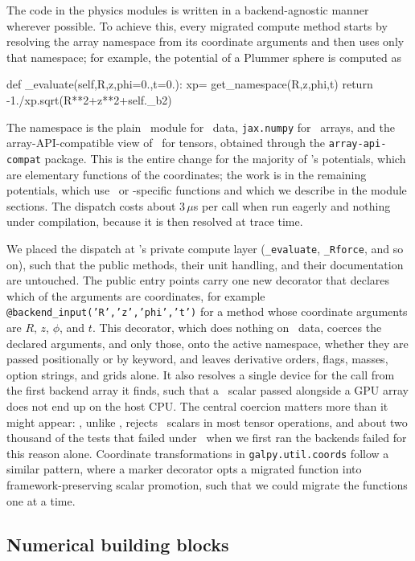 The code in the physics modules is written in a backend-agnostic
manner wherever possible. To achieve this, every migrated compute
method starts by resolving the array namespace from its coordinate
arguments and then uses only that namespace; for example, the
potential of a Plummer sphere is computed as
\begin{code}
def _evaluate(self,R,z,phi=0.,t=0.):
    xp= get_namespace(R,z,phi,t)
    return -1./xp.sqrt(R**2+z**2+self._b2)
\end{code}
The namespace is the plain \numpy\ module for \numpy\ data,
\texttt{jax.numpy} for \jax\ arrays, and the array-API-compatible view of
\torch\ for tensors, obtained through the \texttt{array-api-compat}
package. This is the entire change for the majority of \galpy's
potentials, which are elementary functions of the coordinates; the work
is in the remaining potentials, which use \scipy\ or \numpy-specific functions and
which we describe in the module sections. The dispatch costs about
$3\,\mu$s per call when run eagerly and nothing under compilation,
because it is then resolved at trace time.

We placed the dispatch at \galpy's private compute layer
(\texttt{\_evaluate}, \texttt{\_Rforce}, and so on), such that the public
methods, their unit handling, and their documentation are untouched. The
public entry points carry one new decorator that declares which of the
arguments are coordinates, for example
\texttt{@backend\_input('R','z','phi','t')} for a method whose
coordinate arguments are $R$, $z$, $\phi$, and $t$. This decorator, which does nothing on \numpy\
data, coerces the declared arguments, and only those, onto the active
namespace, whether they are passed positionally or by keyword, and
leaves derivative orders, flags, masses, option strings, and grids
alone. It also resolves a single device for the call from the first
backend array it finds, such that a \python\ scalar passed alongside a
GPU array does not end up on the host CPU. The central coercion matters
more than it might appear: \torch, unlike \jax, rejects \python\ scalars
in most tensor operations, and about two thousand of the tests that
failed under \torch\ when we first ran the backends failed for this
reason alone. Coordinate transformations in \texttt{galpy.util.coords}
follow a similar pattern, where a marker decorator opts a migrated
function into framework-preserving scalar promotion, such that we could
migrate the functions one at a time.

\subsection{Numerical building blocks}\label{sec:design-numerics}

